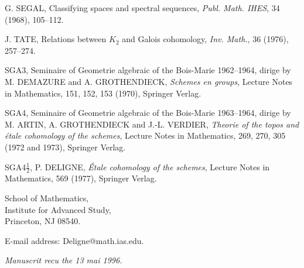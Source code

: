 \documentclass[11pt,a4paper]{article}
\theoremstyle{plain}
\theoremstyle{definition}
\begin{document}
\begin{enumerate}[label={[\arabic*]}, leftmargin=*, itemsep=0.5em]
\item G. SEGAL, Classifying spaces and spectral sequences, \textit{Publ. Math. IHES}, 34 (1968), 105--112.

\item J. TATE, Relations between $K_2$ and Galois cohomology, \textit{Inv. Math.}, 36 (1976), 257--274.

\item SGA3, Seminaire of Geometrie algebraic of the Bois-Marie 1962--1964, dirige by M. DEMAZURE and A. GROTHENDIECK, \textit{Schemes en groups}, Lecture Notes in Mathematics, 151, 152, 153 (1970), Springer Verlag.

\item SGA4, Seminaire of Geometrie algebraic of the Bois-Marie 1963--1964, dirige by M. ARTIN, A. GROTHENDIECK and J.-L. VERDIER, \textit{Theorie of the topos and étale cohomology of the schemes}, Lecture Notes in Mathematics, 269, 270, 305 (1972 and 1973), Springer Verlag.

\item SGA4$\frac{1}{2}$, P. DELIGNE, \textit{Étale cohomology of the schemes}, Lecture Notes in Mathematics, 569 (1977), Springer Verlag.
\end{enumerate}

\vspace{2em}
\noindent School of Mathematics,\\
Institute for Advanced Study,\\
Princeton, NJ 08540.

\vspace{0.5em}
\noindent E-mail address: Deligne@math.ias.edu.

\vspace{1em}
\noindent \textit{Manuscrit recu the 13 mai 1996.}
\end{document}

